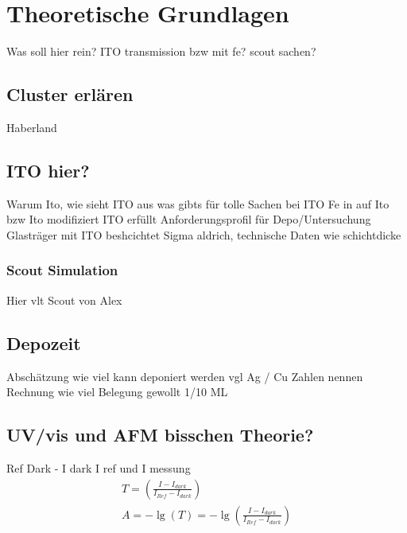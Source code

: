 \chapter{Theoretische Grundlagen}
Was soll hier rein? ITO transmission bzw mit fe? scout sachen?
\section{Cluster erlären}
Haberland
\section{ITO hier?}
Warum Ito, wie sieht ITO aus
was gibts für tolle Sachen  bei ITO
Fe in auf Ito bzw Ito modifiziert
ITO erfüllt Anforderungsprofil für Depo/Untersuchung
Glasträger mit ITO beshcichtet Sigma aldrich, technische Daten wie schichtdicke
\subsection{Scout Simulation}
\label{sec:scoutsim}
Hier vlt Scout von Alex
\section{Depozeit}
Abschätzung wie viel kann deponiert werden vgl Ag / Cu Zahlen nennen
Rechnung wie viel Belegung gewollt 1/10 ML
\section{UV/vis und AFM bisschen Theorie?}
Ref Dark - I dark I ref und I messung
\begin{align*}
    T=\left(\frac{I-I_{dark}}{I_{Ref}-I_{dark}}\right)\\
    A=- \lg\left(T\right) = -\lg\left(\frac{I-I_{dark}}{I_{Ref}-I_{dark}}\right)
\end{align*}
